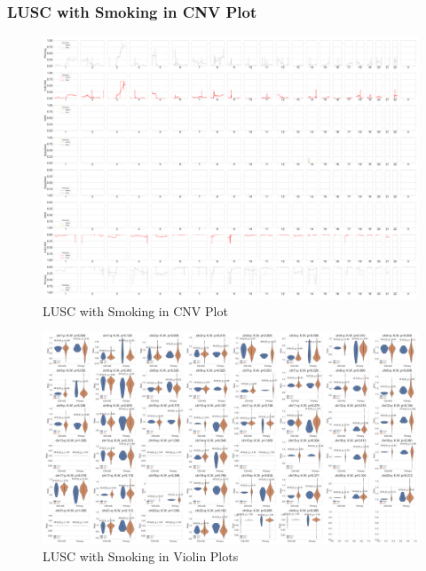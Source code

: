 \documentclass{beamer}
\begin{document}
    \begin{frame}[allowframebreaks]
        \frametitle{LUSC with Smoking in CNV Plot}

        \begin{figure}
            \includegraphics[width=0.6 \linewidth]{figures/PureCN/BWA-simple-SQC.Smoking.pdf}
            \caption{LUSC with Smoking in CNV Plot}
        \end{figure}

        \begin{figure}
            \includegraphics[width=0.8 \linewidth]{figures/PureCN/BWA-violin-SQC.Smoking.pdf}
            \caption{LUSC with Smoking in Violin Plots}
        \end{figure}
    \end{frame}
\end{document}
